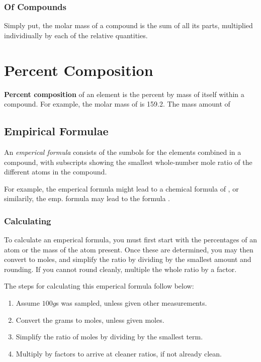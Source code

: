 \subsubsection{Of Compounds}
Simply put, the molar mass of a compound is the sum of all its parts, multiplied
individiually by each of the relative quantities.

\section{Percent Composition}
\textbf{Percent composition} of an element is the percent by mass of itself
within a compound.  For example, the molar mass of  is 159.2.  The mass
amount of 

\subsection{Empirical Formulae}
An \textit{emperical formula} consists of the sumbols for the elements combined
in a compound, with subscripts showing the smallest whole-number mole ratio of
the different atoms in the compound.

For example, the emperical formula  might lead to a chemical formula of
, or similarily, the emp. formula  may lead to the formula
.

\subsubsection{Calculating}
To calculate an emperical formula, you must first start with the percentages of
an atom or the mass of the atom present.  Once these are determined, you may
then convert to moles, and simplify the ratio by dividing by the smallest amount
and rounding.  If you cannot round cleanly, multiple the whole ratio by a
factor.

The steps for calculating this emperical formula follow below:

\begin{enumerate}
  \item Assume $100g$s was sampled, unless given other measurements.
  \item Convert the grams to moles, unless given moles.
  \item Simplify the ratio of moles by dividing by the smallest term.
  \item Multiply by factors to arrive at cleaner ratios, if not already clean.
\end{enumerate}

